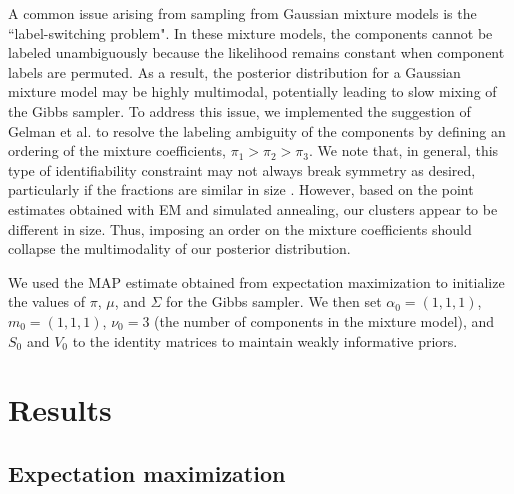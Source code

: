 \documentclass[twoside]{article}
\theoremstyle{theorem}
\theoremstyle{theorem}
\theoremstyle{theorem}
\theoremstyle{lemma}
\theoremstyle{definition}
\theoremstyle{example}
\begin{document}
A common issue arising from sampling from Gaussian mixture models is the ``label-switching problem". In these mixture models, the components cannot be labeled unambiguously because the likelihood remains constant when component labels are permuted.  As a result, the posterior distribution for a Gaussian mixture model may be highly multimodal, potentially leading to slow mixing of the Gibbs sampler. To address this issue, we implemented the suggestion of Gelman et al. \cite{Gelman} to resolve the labeling ambiguity of the components by defining an ordering of the mixture coefficients, $\pi_1 > \pi_2 > \pi_3$. We note that, in general, this type of identifiability constraint may not always break symmetry as desired, particularly if the fractions are similar in size \cite{Stephens}. However, based on the point estimates obtained with EM and simulated annealing, our clusters appear to be different in size. Thus, imposing an order on the mixture coefficients should collapse the multimodality of our posterior distribution.

We used the MAP estimate obtained from expectation maximization to initialize the values of $\pi$, $\mu$, and $\Sigma$ for the Gibbs sampler. We then set $\alpha_0 = (1,1,1)$, $m_0 = (1,1,1)$, $\nu_0 = 3$ (the number of components in the mixture model), and $S_0$ and $V_0$ to the identity matrices to maintain weakly informative priors.   

\section{Results}

\subsection{Expectation maximization}
\end{document}
